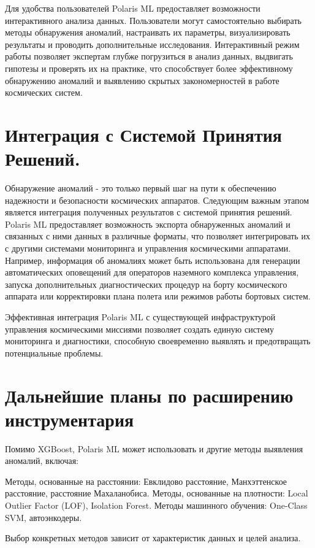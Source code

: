 \documentclass[14pt, a4paper]{../cls/coursework}
\begin{document}
    Для удобства пользователей Polaris ML предоставляет возможности интерактивного анализа данных.
    Пользователи могут самостоятельно выбирать методы обнаружения аномалий, настраивать их параметры, визуализировать результаты и проводить дополнительные исследования.
    Интерактивный режим работы позволяет экспертам глубже погрузиться в анализ данных, выдвигать гипотезы и проверять их на практике, что способствует более эффективному обнаружению аномалий и выявлению скрытых закономерностей в работе космических систем.

    \section{Интеграция с Системой Принятия Решений.}

    Обнаружение аномалий - это только первый шаг на пути к обеспечению надежности и безопасности космических аппаратов.
    Следующим важным этапом является интеграция полученных результатов с системой принятия решений.
    Polaris ML предоставляет возможность экспорта обнаруженных аномалий и связанных с ними данных в различные форматы, что позволяет интегрировать их с другими системами мониторинга и управления космическими аппаратами.
    Например, информация об аномалиях может быть использована для генерации автоматических оповещений для операторов наземного комплекса управления,
    запуска дополнительных диагностических процедур на борту космического аппарата или корректировки плана полета или режимов работы бортовых систем.

    Эффективная интеграция Polaris ML с существующей инфраструктурой управления космическими миссиями позволяет создать единую систему мониторинга и диагностики, способную своевременно выявлять и предотвращать потенциальные проблемы.

    \section{Дальнейшие планы по расширению инструментария}

    Помимо XGBoost, Polaris ML может использовать и другие методы выявления аномалий, включая:

    Методы, основанные на расстоянии: Евклидово расстояние, Манхэттенское расстояние, расстояние Махаланобиса.
    Методы, основанные на плотности: Local Outlier Factor (LOF), Isolation Forest.
    Методы машинного обучения: One-Class SVM, автоэнкодеры.

    Выбор конкретных методов зависит от характеристик данных и целей анализа.
\end{document}
